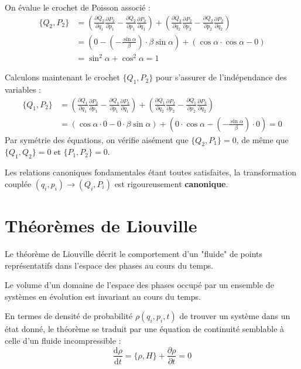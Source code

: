 \documentclass[french]{yLectureNote}
\newcommand{\dd}{\mathrm{d}}
\begin{document}
On évalue le crochet de Poisson associé :
\begin{align*}
    \{Q_2, P_2\} &= \left(\frac{\partial Q_2}{\partial q_1}\frac{\partial P_2}{\partial p_1} - \frac{\partial Q_2}{\partial p_1}\frac{\partial P_2}{\partial q_1}\right) + \left(\frac{\partial Q_2}{\partial q_2}\frac{\partial P_2}{\partial p_2} - \frac{\partial Q_2}{\partial p_2}\frac{\partial P_2}{\partial q_2}\right) \\
    &= \left(0 - \left(-\frac{\sin \alpha}{\beta}\right) \cdot \beta \sin \alpha\right) + (\cos \alpha \cdot \cos \alpha - 0) \\
    &= \sin^2 \alpha + \cos^2 \alpha = 1
\end{align*}


Calculons maintenant le crochet $\{Q_1, P_2\}$ pour s'assurer de l'indépendance des variables :
\begin{align*}
    \{Q_1, P_2\} &= \left(\frac{\partial Q_1}{\partial q_1}\frac{\partial P_2}{\partial p_1} - \frac{\partial Q_1}{\partial p_1}\frac{\partial P_2}{\partial q_1}\right) + \left(\frac{\partial Q_1}{\partial q_2}\frac{\partial P_2}{\partial p_2} - \frac{\partial Q_1}{\partial p_2}\frac{\partial P_2}{\partial q_2}\right) \\
    &= (\cos \alpha \cdot 0 - 0 \cdot \beta \sin \alpha) + \left(0 \cdot \cos \alpha - \left(-\frac{\sin \alpha}{\beta}\right) \cdot 0\right) = 0
\end{align*}
Par symétrie des équations, on vérifie aisément que $\{Q_2, P_1\} = 0$, de même que $\{Q_1, Q_2\} = 0$ et $\{P_1, P_2\} = 0$.

Les relations canoniques fondamentales étant toutes satisfaites, la transformation couplée $(q_i, p_i) \to (Q_i, P_i)$ est rigoureusement \textbf{canonique}.


\section{Théorèmes de Liouville}

Le théorème de Liouville décrit le comportement d'un "fluide" de points représentatifs dans l'espace des phases au cours du temps.

\begin{theorem}
Le volume d'un domaine de l'espace des phases occupé par un ensemble de systèmes en évolution est invariant au cours du temps. 
\end{theorem}

En termes de densité de probabilité $\rho(q_i, p_i, t)$ de trouver un système dans un état donné, le théorème se traduit par une équation de continuité semblable à celle d'un fluide incompressible :
\begin{equation}
    \frac{\dd \rho}{\dd t} = \{\rho, H\} + \frac{\partial \rho}{\partial t} = 0
\end{equation}
\end{document}

